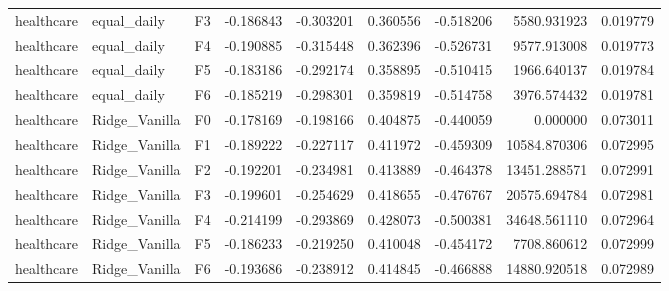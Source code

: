 \begin{tabular}{lllrrrrrr}
healthcare &    equal\_daily &  F3 & -0.186843 & -0.303201 & 0.360556 & -0.518206 &      5580.931923 &             0.019779 \\
healthcare &    equal\_daily &  F4 & -0.190885 & -0.315448 & 0.362396 & -0.526731 &      9577.913008 &             0.019773 \\
healthcare &    equal\_daily &  F5 & -0.183186 & -0.292174 & 0.358895 & -0.510415 &      1966.640137 &             0.019784 \\
healthcare &    equal\_daily &  F6 & -0.185219 & -0.298301 & 0.359819 & -0.514758 &      3976.574432 &             0.019781 \\
healthcare &  Ridge\_Vanilla &  F0 & -0.178169 & -0.198166 & 0.404875 & -0.440059 &         0.000000 &             0.073011 \\
healthcare &  Ridge\_Vanilla &  F1 & -0.189222 & -0.227117 & 0.411972 & -0.459309 &     10584.870306 &             0.072995 \\
healthcare &  Ridge\_Vanilla &  F2 & -0.192201 & -0.234981 & 0.413889 & -0.464378 &     13451.288571 &             0.072991 \\
healthcare &  Ridge\_Vanilla &  F3 & -0.199601 & -0.254629 & 0.418655 & -0.476767 &     20575.694784 &             0.072981 \\
healthcare &  Ridge\_Vanilla &  F4 & -0.214199 & -0.293869 & 0.428073 & -0.500381 &     34648.561110 &             0.072964 \\
healthcare &  Ridge\_Vanilla &  F5 & -0.186233 & -0.219250 & 0.410048 & -0.454172 &      7708.860612 &             0.072999 \\
healthcare &  Ridge\_Vanilla &  F6 & -0.193686 & -0.238912 & 0.414845 & -0.466888 &     14880.920518 &             0.072989 \\
\bottomrule
\end{tabular}
